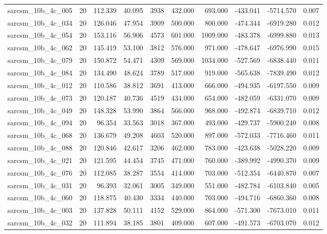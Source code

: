 \begin{tabular}{lrrrrrrrrr}
sarcsm\_10b\_4c\_005 & 20 & 112.339 & 40.095 & 3938 & 432.000 & 693.000 & -433.041 & -5714.570 & 0.007 \\
sarcsm\_10b\_4c\_034 & 20 & 126.046 & 47.954 & 3909 & 500.000 & 800.000 & -474.344 & -6919.280 & 0.012 \\
sarcsm\_10b\_4c\_054 & 20 & 153.116 & 56.906 & 4573 & 601.000 & 1009.000 & -483.378 & -6999.880 & 0.013 \\
sarcsm\_10b\_4c\_062 & 20 & 145.419 & 53.100 & 3812 & 576.000 & 971.000 & -478.647 & -6976.990 & 0.015 \\
sarcsm\_10b\_4c\_079 & 20 & 150.872 & 54.471 & 4309 & 569.000 & 1034.000 & -527.569 & -6838.440 & 0.011 \\
sarcsm\_10b\_4c\_084 & 20 & 134.490 & 48.624 & 3789 & 517.000 & 919.000 & -565.638 & -7839.490 & 0.012 \\
sarcsm\_10b\_4c\_012 & 20 & 110.586 & 38.812 & 3691 & 413.000 & 666.000 & -494.935 & -6197.550 & 0.009 \\
sarcsm\_10b\_4c\_073 & 20 & 120.187 & 40.736 & 4519 & 434.000 & 654.000 & -482.059 & -6331.070 & 0.009 \\
sarcsm\_10b\_4c\_049 & 20 & 148.328 & 53.990 & 3864 & 566.000 & 968.000 & -492.874 & -6839.710 & 0.012 \\
sarcsm\_10b\_4c\_094 & 20 & 96.354 & 33.563 & 3018 & 367.000 & 493.000 & -429.737 & -5900.240 & 0.008 \\
sarcsm\_10b\_4c\_068 & 20 & 136.679 & 49.208 & 4603 & 520.000 & 897.000 & -572.033 & -7716.460 & 0.011 \\
sarcsm\_10b\_4c\_088 & 20 & 120.846 & 42.617 & 3206 & 462.000 & 783.000 & -423.638 & -5028.220 & 0.009 \\
sarcsm\_10b\_4c\_021 & 20 & 121.595 & 44.454 & 3745 & 471.000 & 760.000 & -389.992 & -4990.370 & 0.009 \\
sarcsm\_10b\_4c\_076 & 20 & 112.085 & 38.287 & 3554 & 414.000 & 703.000 & -512.354 & -6440.870 & 0.007 \\
sarcsm\_10b\_4c\_031 & 20 & 96.393 & 32.061 & 3005 & 349.000 & 551.000 & -482.784 & -6103.840 & 0.005 \\
sarcsm\_10b\_4c\_060 & 20 & 118.875 & 40.430 & 3334 & 440.000 & 703.000 & -494.716 & -6860.360 & 0.008 \\
sarcsm\_10b\_4c\_003 & 20 & 137.828 & 50.111 & 4152 & 529.000 & 864.000 & -571.300 & -7673.010 & 0.011 \\
sarcsm\_10b\_4c\_032 & 20 & 111.894 & 38.185 & 3801 & 409.000 & 607.000 & -491.573 & -6703.070 & 0.012 \\

\end{tabular}
